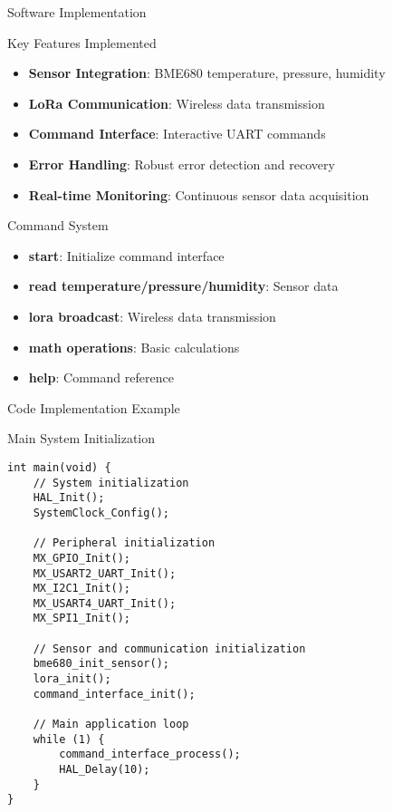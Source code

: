 \documentclass[aspectratio=169]{beamer}
\begin{document}
\begin{frame}{Software Implementation}
\begin{block}{Key Features Implemented}
\begin{itemize}
    \item \textbf{Sensor Integration}: BME680 temperature, pressure, humidity
    \item \textbf{LoRa Communication}: Wireless data transmission
    \item \textbf{Command Interface}: Interactive UART commands
    \item \textbf{Error Handling}: Robust error detection and recovery
    \item \textbf{Real-time Monitoring}: Continuous sensor data acquisition
\end{itemize}
\end{block}

\begin{block}{Command System}
\begin{itemize}
    \item \textbf{start}: Initialize command interface
    \item \textbf{read temperature/pressure/humidity}: Sensor data
    \item \textbf{lora broadcast}: Wireless data transmission
    \item \textbf{math operations}: Basic calculations
    \item \textbf{help}: Command reference
\end{itemize}
\end{block}
\end{frame}

\begin{frame}[fragile]{Code Implementation Example}
\begin{block}{Main System Initialization}
\begin{verbatim}
int main(void) {
    // System initialization
    HAL_Init();
    SystemClock_Config();
    
    // Peripheral initialization
    MX_GPIO_Init();
    MX_USART2_UART_Init();
    MX_I2C1_Init();
    MX_USART4_UART_Init();
    MX_SPI1_Init();
    
    // Sensor and communication initialization
    bme680_init_sensor();
    lora_init();
    command_interface_init();
    
    // Main application loop
    while (1) {
        command_interface_process();
        HAL_Delay(10);
    }
}
\end{verbatim}
\end{block}
\end{frame}
\end{document}

